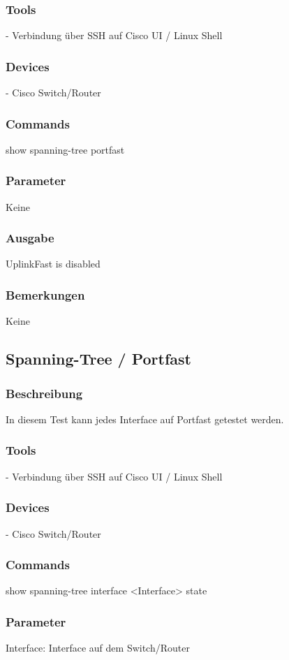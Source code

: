 \documentclass[a4,12pt]{scrartcl}
\begin{document}
\subsubsection{Tools}
- Verbindung über SSH auf Cisco UI / Linux Shell
\subsubsection{Devices}
- Cisco Switch/Router
\subsubsection{Commands}
show spanning-tree portfast
\subsubsection{Parameter}
Keine
\subsubsection{Ausgabe}
UplinkFast is disabled
\subsubsection{Bemerkungen}
Keine


\subsection{Spanning-Tree / Portfast}
\subsubsection{Beschreibung}
In diesem Test kann jedes Interface auf Portfast getestet werden.
\subsubsection{Tools}
- Verbindung über SSH auf Cisco UI / Linux Shell
\subsubsection{Devices}
- Cisco Switch/Router
\subsubsection{Commands}
show spanning-tree interface <Interface> state
\subsubsection{Parameter}
Interface: Interface auf dem Switch/Router
\end{document}
